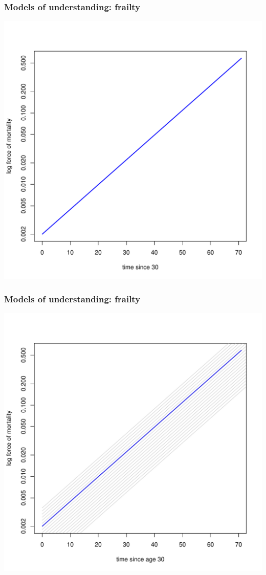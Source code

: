 \documentclass[20pt]{beamer}
\begin{document}
\begin{frame}
\frametitle{Models of understanding: frailty}
\vspace{-2em}
\begin{center}
\includegraphics{Figures/Frailty1.pdf}
\end{center}
\end{frame}

\begin{frame}
\frametitle{Models of understanding: frailty}
\vspace{-2em}
\begin{center}
\includegraphics{Figures/Frailty2.pdf}
\end{center}
\end{frame}
\end{document}
